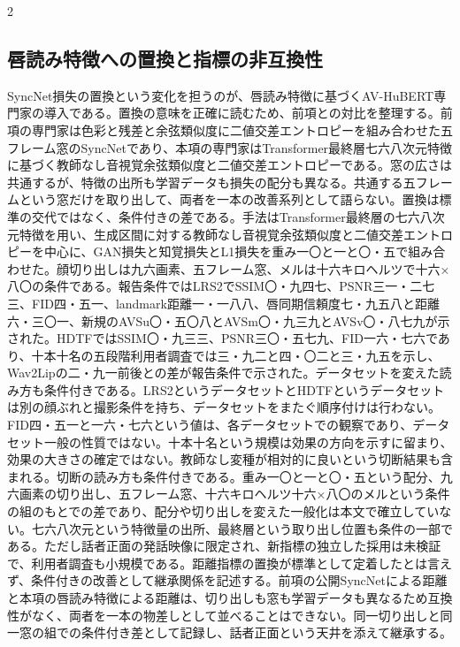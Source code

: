 \documentclass[lualatex,a4paper,10pt]{jlreq}
\begin{document}
\begin{multicols}{2}
\raggedcolumns
\subsection{唇読み特徴への置換と指標の非互換性}
SyncNet損失の置換という変化を担うのが、唇読み特徴に基づくAV-HuBERT専門家の導入である\autocite{btd130}。置換の意味を正確に読むため、前項との対比を整理する。前項の専門家は色彩と残差と余弦類似度に二値交差エントロピーを組み合わせた五フレーム窓のSyncNetであり、本項の専門家はTransformer最終層七六八次元特徴に基づく教師なし音視覚余弦類似度と二値交差エントロピーである。窓の広さは共通するが、特徴の出所も学習データも損失の配分も異なる。共通する五フレームという窓だけを取り出して、両者を一本の改善系列として語らない。置換は標準の交代ではなく、条件付きの差である\autocite{btd129,btd130}。手法はTransformer最終層の七六八次元特徴を用い、生成区間に対する教師なし音視覚余弦類似度と二値交差エントロピーを中心に、GAN損失と知覚損失とL1損失を重み一〇と一と〇・五で組み合わせた。顔切り出しは九六画素、五フレーム窓、メルは十六キロヘルツで十六×八〇の条件である\autocite{btd130}。報告条件ではLRS2でSSIM〇・九四七、PSNR三一・二七三、FID四・五一、landmark距離一・一八八、唇同期信頼度七・九五八と距離六・三〇一、新規のAVSu〇・五〇八とAVSm〇・九三九とAVSv〇・八七九が示された。HDTFではSSIM〇・九三三、PSNR三〇・五七九、FID一六・七六であり、十本十名の五段階利用者調査では三・九二と四・〇二と三・九五を示し、Wav2Lipの二・九一前後との差が報告条件で示された\autocite{btd130}。データセットを変えた読み方も条件付きである。LRS2というデータセットとHDTFというデータセットは別の顔ぶれと撮影条件を持ち、データセットをまたぐ順序付けは行わない。FID四・五一と一六・七六という値は、各データセットでの観察であり、データセット一般の性質ではない。十本十名という規模は効果の方向を示すに留まり、効果の大きさの確定ではない\autocite{btd130}。教師なし変種が相対的に良いという切断結果も含まれる\autocite{btd130}。切断の読み方も条件付きである。重み一〇と一と〇・五という配分、九六画素の切り出し、五フレーム窓、十六キロヘルツ十六×八〇のメルという条件の組のもとでの差であり、配分や切り出しを変えた一般化は本文で確立していない。七六八次元という特徴量の出所、最終層という取り出し位置も条件の一部である\autocite{btd130}。ただし話者正面の発話映像に限定され、新指標の独立した採用は未検証で、利用者調査も小規模である。距離指標の置換が標準として定着したとは言えず、条件付きの改善として継承関係を記述する。前項の公開SyncNetによる距離と本項の唇読み特徴による距離は、切り出しも窓も学習データも異なるため互換性がなく、両者を一本の物差しとして並べることはできない。同一切り出しと同一窓の組での条件付き差として記録し、話者正面という天井を添えて継承する。


\end{multicols}
\end{document}
